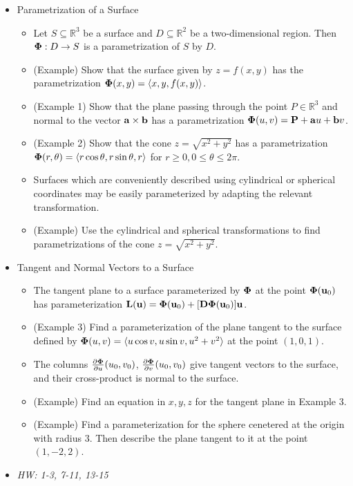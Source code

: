 \documentclass[11pt]{article}
\begin{document}
\begin{itemize}
  \item Parametrization of a Surface
    \begin{itemize}
      \item Let \(S\subseteq \mathbb R^3\) be a surface and
            \(D\subseteq \mathbb R^2\)
            be a two-dimensional region. Then \(\mathbf{\Phi}:D\to S\) is a parametrization
            of \(S\) by \(D\).
      \item (Example) Show that the surface given by \(z=f(x,y)\)
            has the parametrization \(\mathbf{\Phi}(x,y)=\langle x,y,f(x,y)\rangle\).
      \item (Example 1) Show that the plane passing through the point
            \(P\in\mathbb R^3\)
            and normal to the vector \(\mathbf{a}\times\mathbf{b}\) has a parametrization
            \(\mathbf{\Phi}(u,v)=\mathbf{P}+\mathbf{a}u+\mathbf{b}v\).
      \item (Example 2) Show that the cone \(z=\sqrt{x^2+y^2}\) has a
            parametrization \(\mathbf{\Phi}(r,\theta)=\langle r\cos\theta,r\sin\theta,r\rangle\)
            for \(r\geq 0,0\leq\theta\leq2\pi\).
      \item Surfaces which are conveniently described using cylindrical
            or spherical coordinates may be easily parameterized by adapting
            the relevant transformation.
      \item (Example) Use the cylindrical and spherical transformations to
            find parametrizations of the cone \(z=\sqrt{x^2+y^2}\).
    \end{itemize}
  \item Tangent and Normal Vectors to a Surface
    \begin{itemize}
      \item The tangent plane to a surface parameterized by \(\mathbf{\Phi}\)
            at the point \(\mathbf{\Phi}(\mathbf{u}_0)\) has parameterization
            \(
              \mathbf{L}(\mathbf{u})
                =
              \mathbf{\Phi}(\mathbf{u}_0)+[\mathbf{D}\mathbf{\Phi}(\mathbf{u}_0)]\mathbf{u}
            \).
      \item (Example 3) Find a parameterization of the plane tangent
            to the surface defined by
            \(\mathbf{\Phi}(u,v)=\langle u\cos v,u\sin v,u^2+v^2\rangle\) at the point
            \((1,0,1)\).
      \item The columns \(\frac{\partial\mathbf{\Phi}}{\partial u}(u_0,v_0)\),
            \(\frac{\partial\mathbf{\Phi}}{\partial v}(u_0,v_0)\) give tangent vectors to
            the surface, and their cross-product is normal to the surface.
      \item (Example) Find an equation in \(x,y,z\) for the tangent plane
            in Example 3.
      \item (Example) Find a parameterization for the sphere cenetered at
            the origin with radius \(3\). Then describe the plane tangent
            to it at the point \((1,-2,2)\).
    \end{itemize}
  \item\textit{
    HW: 1-3, 7-11, 13-15
  }
\end{itemize}
\end{document}

